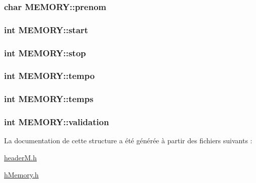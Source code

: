 \subsubsection[{\texorpdfstring{prenom}{prenom}}]{\setlength{\rightskip}{0pt plus 5cm}char M\+E\+M\+O\+R\+Y\+::prenom}\hypertarget{struct_m_e_m_o_r_y_a0b33653d2a999660bd3c639eabe6caef}{}\label{struct_m_e_m_o_r_y_a0b33653d2a999660bd3c639eabe6caef}
\subsubsection[{\texorpdfstring{start}{start}}]{\setlength{\rightskip}{0pt plus 5cm}int M\+E\+M\+O\+R\+Y\+::start}\hypertarget{struct_m_e_m_o_r_y_a29f694b7714a58d55e9b7c06480c9b93}{}\label{struct_m_e_m_o_r_y_a29f694b7714a58d55e9b7c06480c9b93}
\subsubsection[{\texorpdfstring{stop}{stop}}]{\setlength{\rightskip}{0pt plus 5cm}int M\+E\+M\+O\+R\+Y\+::stop}\hypertarget{struct_m_e_m_o_r_y_aeebed2e935c7e36b7ee23a5f699dae0b}{}\label{struct_m_e_m_o_r_y_aeebed2e935c7e36b7ee23a5f699dae0b}
\subsubsection[{\texorpdfstring{tempo}{tempo}}]{\setlength{\rightskip}{0pt plus 5cm}int M\+E\+M\+O\+R\+Y\+::tempo}\hypertarget{struct_m_e_m_o_r_y_a4f79ed479e9443011fb8aae0244fadd0}{}\label{struct_m_e_m_o_r_y_a4f79ed479e9443011fb8aae0244fadd0}
\subsubsection[{\texorpdfstring{temps}{temps}}]{\setlength{\rightskip}{0pt plus 5cm}int M\+E\+M\+O\+R\+Y\+::temps}\hypertarget{struct_m_e_m_o_r_y_a7d203f387ea4eb67c8102e8e87ff8fd1}{}\label{struct_m_e_m_o_r_y_a7d203f387ea4eb67c8102e8e87ff8fd1}
\subsubsection[{\texorpdfstring{validation}{validation}}]{\setlength{\rightskip}{0pt plus 5cm}int M\+E\+M\+O\+R\+Y\+::validation}\hypertarget{struct_m_e_m_o_r_y_a450eaf3090c596674dde1786a71ea9d4}{}\label{struct_m_e_m_o_r_y_a450eaf3090c596674dde1786a71ea9d4}


La documentation de cette structure a été générée à partir des fichiers suivants \+:\begin{DoxyCompactItemize}
\item 
\hyperlink{header_m_8h}{header\+M.\+h}\item 
\hyperlink{h_memory_8h}{h\+Memory.\+h}\end{DoxyCompactItemize}
